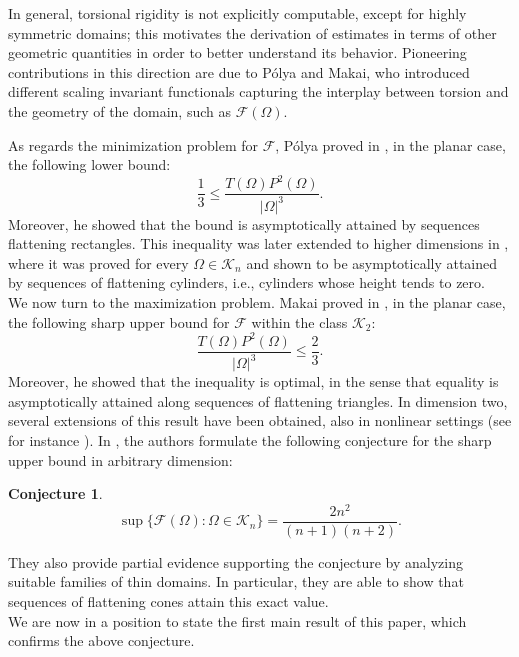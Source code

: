 \documentclass[oneside,a4paper,11pt,notitlepage]{article}
\theoremstyle{definition}
\theoremstyle{plain}
\theoremstyle{definition}
\newtheorem{congettura}[esempio]{Conjecture}
\begin{document}
In general, torsional rigidity is not explicitly computable, except for highly symmetric domains; this motivates the derivation of estimates in terms of other geometric quantities in order to better understand its behavior. Pioneering contributions in this direction are due to Pólya and Makai, who introduced different scaling invariant functionals capturing the interplay between torsion and the geometry of the domain, such as $\mathcal F(\Omega)$.

As regards the minimization problem for $\mathcal F$, Pólya proved in \cite{polya1960}, in the planar case, the following lower bound:
\begin{equation}
\label{polyatorsion}
\frac{1}{3} \leq \frac{T(\Omega) P^2(\Omega)}{|\Omega|^3}.
\end{equation}
Moreover, he showed that the bound is asymptotically attained by sequences flattening rectangles. This inequality was later extended to higher dimensions in \cite{gavitone_2014}, where it was proved for every $\Omega \in \mathcal{K}_n$ and shown to be asymptotically attained by sequences of flattening cylinders, i.e., cylinders whose height tends to zero.\\ 
We now turn to the maximization problem. Makai proved in \cite{makai}, in the planar case, the following sharp upper bound for $\mathcal F$ within the class $\mathcal{K}_2$:
\begin{equation}
\label{makaitorsion}
\frac{T(\Omega) P^2(\Omega)}{|\Omega|^3} \leq \frac{2}{3}.
\end{equation}
Moreover, he showed that the inequality is optimal, in the sense that equality is asymptotically attained along sequences of flattening triangles. In dimension two, several extensions of this result have been obtained, also in nonlinear settings (see for instance \cite{dellapietra_gavitone2018,fragala_gazzola_lamboley2013,HLP2018}). In \cite{buttazzo2020convex}, the authors formulate the following conjecture for the sharp upper bound in arbitrary dimension:
\begin{congettura}\label{congettura}
\[
\sup\{\mathcal F(\Omega) : \Omega \in \mathcal{K}_n\}
= \frac{2n^2}{(n+1)(n+2)}.
\]
\end{congettura}
They also provide partial evidence supporting the conjecture by analyzing suitable families of thin domains. In particular, they are able to show that sequences of flattening cones attain this exact value.
\\
We are now in a position to state the first main result of this paper, which confirms the above conjecture.
\end{document}
